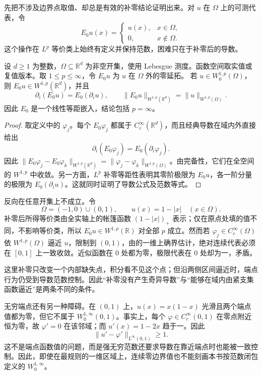 先把不涉及边界点取值、却总是有效的补零结论证明出来。对 \(u\) 在 \(\Omega\) 上的可测代表，令
\[
 E_0u(x)=
 \begin{cases}
 u(x),&x\in\Omega,\\
 0,&x\notin\Omega.
 \end{cases}
\]
这个操作在 \(L^p\) 等价类上始终有定义并保持范数，困难只在于补零后的导数。

\begin{proposition}\label{b1:prop:w0-zero-extension}
设 \(d\geq1\) 为整数，\(\Omega\subseteq\mathbb R^d\) 为非空开集，使用 Lebesgue 测度。函数空间取实值或复值版本。取 \(1\leq p\leq\infty\)，令 \(E_0u\) 为 \(u\) 在 \(\Omega\) 外的零延拓。
若 \(u\in W_0^{1,p}(\Omega)\)，则 \(E_0u\in W^{1,p}(\mathbb R^d)\)，并且
\[
 \partial_i(E_0u)=E_0(\partial_i u),\qquad
 \|E_0u\|_{W^{1,p}(\mathbb R^d)}=\|u\|_{W^{1,p}(\Omega)}.
\]
因此 \(E_0\) 是一个线性等距嵌入，结论包括 \(p=\infty\)。
\end{proposition}
\begin{proof}
取定义中的 \(\varphi_j\)。每个 \(E_0\varphi_j\) 都属于 \(C_c^\infty(\mathbb R^d)\)，而且经典导数在域内外直接给出
\[
 \partial_i(E_0\varphi_j)=E_0(\partial_i\varphi_j).
\]
因此 \(\|E_0\varphi_j-E_0\varphi_k\|_{W^{1,p}(\mathbb R^d)}
=\|\varphi_j-\varphi_k\|_{W^{1,p}(\Omega)}\)。由完备性，它们在全空间的 \(W^{1,p}\) 中收敛。另一方面，\(L^p\) 补零等距性表明其零阶极限为 \(E_0u\)，各一阶分量的极限为 \(E_0(\partial_i u)\)。这就同时证明了导数公式及范数等式。
\end{proof}

反向在任意开集上不成立。令
\[
 \Omega=(-1,0)\cup(0,1),\qquad u(x)=1-|x|\quad(x\in\Omega).
\]
补零后所得等价类由全实轴上的帐篷函数 \((1-|x|)_+\) 表示；仅在原点处填的值不同，不影响等价类，所以 \(E_0u\in W^{1,p}(\mathbb R)\) 对全部 \(p\) 成立。然而若 \(\varphi_j\in C_c^\infty(\Omega)\) 依 \(W^{1,p}(\Omega)\) 逼近 \(u\)，限制到 \((0,1)\)，由的一维上确界估计，绝对连续代表必须在 \([0,1]\) 上一致收敛。近似函数在 \(0\) 处都为零，极限代表在 \(0\) 处却为一，矛盾。

\ProseParagraphBreak

这里补零只改变一个内部缺失点，积分看不见这个点；但沿两侧区间逼近时，端点行为仍受到导数范数控制。因此“补零没有产生奇异导数”与“能够在域内由紧支集函数逼近”是两条不同的条件。

\ProseParagraphBreak

无穷端点还有另一种障碍。在 \((0,1)\) 上，\(u(x)=x(1-x)\) 光滑且两个端点值都为零，但它不属于 \(W_0^{1,\infty}(0,1)\)。事实上，每个 \(\varphi\in C_c^\infty(0,1)\) 在零点附近恒为零，故 \(\varphi'=0\) 在该邻域；而 \(u'(x)=1-2x\) 趋于一。因此
\[
 \|u'-\varphi'\|_{L^\infty(0,1)}\ge1.
\]
这不是端点函数值的问题，而是强无穷范数还要求导数在靠近端点时也能被一致控制。因此，即使在最规则的一维区域上，连续零边界值也不能刻画本书按范数闭包定义的 \(W_0^{1,\infty}\)。

